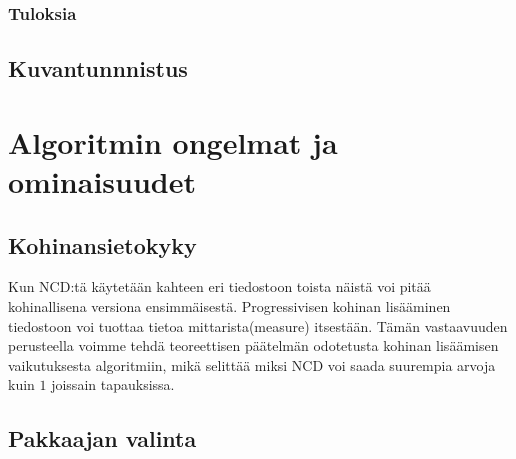 \documentclass[12pt,finnish,draft,twoside]{tktltiki2}
\theoremstyle{definition}
\theoremstyle{remark}
\begin{document}
    \subsubsection{Tuloksia} %
    \label{ssub:tuloksia}

  \subsection{Kuvantunnnistus} %
  \label{sub:kuvantunnnistus}


\section{Algoritmin ongelmat ja ominaisuudet} %
\label{sec:algoritmin_ongelmat_ja_ominaisuudet}
  \subsection{Kohinansietokyky} %
  \label{sub:kohinansietokyky}
    Kun NCD:tä käytetään kahteen eri tiedostoon toista näistä voi pitää kohinallisena versiona ensimmäisestä. Progressivisen kohinan lisääminen tiedostoon voi tuottaa tietoa mittarista(measure) itsestään. Tämän vastaavuuden perusteella voimme tehdä teoreettisen päätelmän odotetusta kohinan lisäämisen vaikutuksesta algoritmiin, mikä selittää miksi NCD voi saada suurempia arvoja kuin $1$ joissain tapauksissa. \cite{4167725}


  \subsection{Pakkaajan valinta} %
  \label{sub:pakkaajan_valinta}

    \iffalse
      TODO: This paper shows that the compressors used to compute the normalized compression distance are not idempotent in some cases, being strongly skewed with the size of the objects and window size, and therefore causing a deviation in the identity property of the distance if we don’t take care that the objects to be compressed fit the windows. The relationship underlying the precision of the distance and the size of the objects has been analyzed for several well-known compressors, and specially in depth for three cases, bzip2, gzip and PPMZ which are examples of the three main types of compressors: block-sorting, Lempel-Ziv, and statistic.
    \fi
\end{document}
